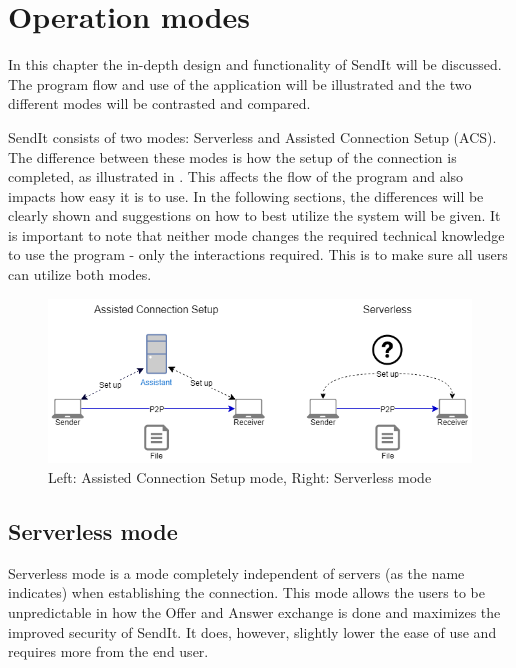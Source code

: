 %
\chapter{Operation modes} %
%


\label{Chapter5} %
%
In this chapter the in-depth design and functionality of SendIt will be discussed. The program flow and use of the application will be illustrated and the two different modes will be contrasted and compared.

SendIt consists of two modes: Serverless and Assisted Connection Setup (ACS). The difference between these modes is how the setup of the connection is completed, as illustrated in . This affects the flow of the program and also impacts how easy it is to use. In the following sections, the differences will be clearly shown and suggestions on how to best utilize the system will be given. It is important to note that neither mode changes the required technical knowledge to use the program - only the interactions required. This is to make sure all users can utilize both modes.

%
\begin{figure}
	\centering
	\includegraphics[width=\textwidth]{Figures/SendIt_mode_comparison}
	\caption[SendIt mode comparison]{Left: Assisted Connection Setup mode, Right: Serverless mode} \label{fig:mode_comparison}
\end{figure}

%
\section{Serverless mode}
%
Serverless mode is a mode completely independent of servers (as the name indicates) when establishing the connection. This mode allows the users to be unpredictable in how the Offer and Answer exchange is done and maximizes the improved security of SendIt. It does, however, slightly lower the ease of use and requires more from the end user.
%
